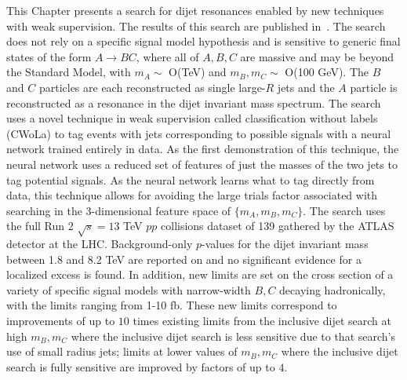 This Chapter presents a search for dijet resonances enabled by new techniques with weak supervision.
The results of this search are published in~\cite{Aad:2020cws}.
The search does not rely on a specific signal model hypothesis and is sensitive to generic final states of the form $A\rightarrow BC$, where all of $A,B,C$ are massive and may be beyond the Standard Model, with $m_A\sim$ O(TeV) and $m_B,m_C\sim$ O(100 GeV).
The $B$ and $C$ particles are each reconstructed as single large-$R$ jets and the $A$ particle is reconstructed as a resonance in the dijet invariant mass spectrum.
The search uses a novel technique in weak supervision called classification without labels (CWoLa) to tag events with jets corresponding to possible signals with a neural network trained entirely in data.
As the first demonstration of this technique, the neural network uses a reduced set of features of just the masses of the two jets to tag potential signals.
As the neural network learns what to tag directly from data, this technique allows for avoiding the large trials factor associated with searching in the 3-dimensional feature space of $\{m_A,m_B,m_C\}$.
The search uses the full Run 2 $\sqrt{s}=13$ TeV $pp$ collisions dataset of 139\ifb{} gathered by the ATLAS detector at the LHC.
Background-only $p$-values for the dijet invariant mass between 1.8 and 8.2 TeV are reported on and no significant evidence for a localized excess is found.
In addition, new limits are set on the cross section of a variety of specific signal models with narrow-width $B,C$ decaying hadronically, with the limits ranging from 1-10 fb.
These new limits correspond to improvements of up to $10$ times existing limits from the inclusive dijet search at high $m_B,m_C$ where the inclusive dijet search is less sensitive due to that search's use of small radius jets; limits at lower values of $m_B,m_C$ where the inclusive dijet search is fully sensitive are improved by factors of up to $4$.

